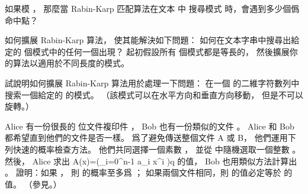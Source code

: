 \startsection[
  title={The Rabin-Karp algorithm},
]

\startEXERCISE
如果模 ，
那麼當 Rabin-Karp 匹配算法在文本  中
搜尋模式  時，會遇到多少個僞命中點？
\stopEXERCISE

\startANSWER
{}
\stopANSWER

\startEXERCISE
如何擴展 Rabin-Karp 算法，
使其能解決如下問題：
如何在文本字串中搜尋出給定的  個模式中的任何一個出現？
起初假設所有  個模式都是等長的，
然後擴展你的算法以適用於不同長度的模式。
\stopEXERCISE

\startANSWER
{}
\stopANSWER

\startEXERCISE
試說明如何擴展 Rabin-Karp 算法用於處理一下問題：
在一個  的二維字符數列中搜索一個給定的  的模式。
（該模式可以在水平方向和垂直方向移動，
但是不可以旋轉。）
\stopEXERCISE

\startANSWER
{}
\stopANSWER

\startEXERCISE
Alice 有一份很長的  位文件複印件 ，
 Bob 也有一份類似的文件 。
 Alice 和 Bob 都希望直到他們的文件是否一樣。
爲了避免傳送整個文件 A 或 B，
他們運用下列快速的概率檢查方法。
他們共同選擇一個素數 ，
並從  中隨機選取一個整數 。
然後， Alice 求出
\startformula
A(x)=\left(\sum_{i=0}^{n-1} a_i x^i \right)\mod q
\stopformula
的值， Bob 也用類似方法計算出 。
證明：如果 ，
則  的概率至多爲 ；
如果兩個文件相同，則  的值必定等於  的值。
（\hint 參見。）
\stopEXERCISE

\startANSWER
{}
\stopANSWER

\stopsection
